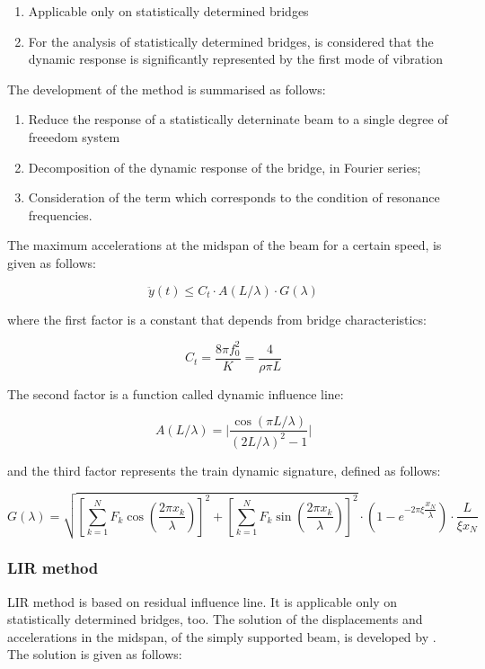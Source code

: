 \begin{enumerate} [-]
	\item Applicable only on statistically determined bridges
	\item For the analysis of statistically determined bridges, is considered that the dynamic response is significantly represented by the first mode of vibration
\end{enumerate}

The development of the method is summarised as follows:

\begin{enumerate}
	\item Reduce the response of a statistically deterninate beam to a single degree of freeedom system
	\item Decomposition of the dynamic response of the bridge, in Fourier series;
	\item Consideration of the term which corresponds to the condition of resonance frequencies.
\end{enumerate}

The maximum accelerations at the midspan of the beam for a certain speed, is given as follows:

\begin{equation}
	\ddot{y}(t)\leq C_t\cdot A(L/\lambda)\cdot G(\lambda)
\end{equation}

where the first factor is a constant that depends from bridge characteristics:

\begin{equation}
	C_t=\dfrac{8\pi f_0^2}{K}=\dfrac{4}{\rho\pi L}  
\end{equation}

The second factor is a function called dynamic influence line:

\begin{equation}
	A(L/\lambda )= \bigg\vert\dfrac{\cos (\pi L/\lambda)}{(2L/\lambda)^2-1} \bigg\vert
\end{equation}

and the third factor represents the train dynamic signature, defined as follows:

\begin{equation}
	G(\lambda)=\sqrt{[\sum_{k=1}^N F_k\cos(\dfrac{2\pi x_k}{\lambda})]^2+[\sum_{k=1}^N F_k \sin(\dfrac{2\pi x_k}{\lambda})]^2}\cdot (1-e^{-2\pi \xi \dfrac{x_N}{\lambda}})\cdot \dfrac{L}{\xi x_N}
\end{equation}

\subsubsection{LIR method}
LIR method is based on residual influence line. It is applicable only on statistically determined bridges, too. The solution of the displacements and accelerations in the midspan, of the simply supported beam, is developed by \citeauthor{dominguez2001dinamica}. The solution is given as follows:

